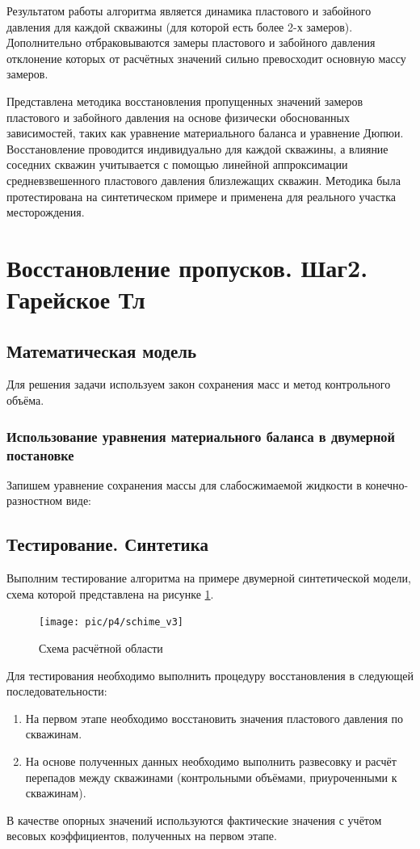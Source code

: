 \documentclass[14pt]{article}
\begin{document}
Результатом работы алгоритма является динамика пластового и забойного давления для каждой скважины (для которой есть более 2-х замеров). Дополнительно отбраковываются замеры пластового и забойного давления отклонение которых от расчётных значений сильно превосходит основную массу замеров.

Представлена методика восстановления пропущенных значений замеров пластового и забойного давления на основе физически обоснованных зависимостей, таких как уравнение материального баланса и уравнение Дюпюи. Восстановление проводится индивидуально для каждой скважины, а влияние соседних скважин учитывается с помощью линейной аппроксимации средневзвешенного пластового давления близлежащих скважин. Методика была протестирована на синтетическом примере и применена для реального участка месторождения.

\section{Восстановление пропусков. Шаг2. Гарейское Тл}

\subsection{Математическая модель}
Для решения задачи используем закон сохранения масс и метод контрольного объёма. 

\subsubsection{Использование уравнения материального баланса в двумерной постановке} Запишем уравнение сохранения массы для слабосжимаемой жидкости в конечно-разностном виде:

\subsection{Тестирование. Синтетика}
Выполним тестирование алгоритма на примере двумерной синтетической модели, схема которой представлена на  рисунке \ref{fig:map_kp_v2}. 
\begin{figure}
	\centering
	\texttt{[image: pic/p4/schime\_v3]}
	\caption{Схема расчётной области}
	\label{fig:map_kp_v2}
\end{figure}

Для тестирования необходимо выполнить процедуру восстановления в следующей последовательности:
\begin{enumerate}
	\item На первом этапе необходимо восстановить значения пластового давления по скважинам.
	\item На основе полученных данных необходимо выполнить развесовку и расчёт перепадов между скважинами (контрольными объёмами, приуроченными к скважинам).
\end{enumerate}
В качестве опорных значений используются фактические значения с учётом весовых коэффициентов, полученных на первом этапе. 
\end{document}
